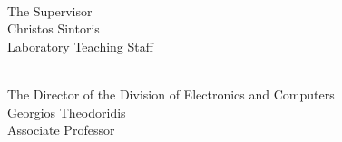 \begin{center}
    \begin{minipage}[t]{0.45\textwidth}
        \begin{center}
            \underline{\hspace{5cm}} \\[0.2em]
            The Supervisor \\[3.5em] %
            Christos Sintoris \\[0.5em]
            Laboratory Teaching Staff
        \end{center}
    \end{minipage}%
    \hfill
    \begin{minipage}[t]{0.45\textwidth}
        \begin{center}
            \underline{\hspace{5cm}} \\[0.2em]
            The Director of the Division of Electronics and Computers \\[1.6em] %
            Georgios Theodoridis \\[0.5em]
            Associate Professor
        \end{center}
    \end{minipage}    
    
\end{center}

\thispagestyle{empty}